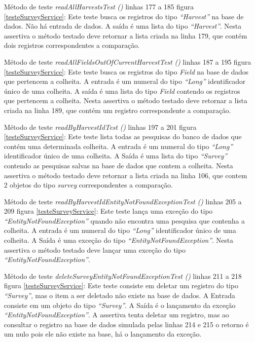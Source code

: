 Método de teste \textit{ readAllHarvestsTest ()} linhas 177 a 185 figura \ref{testeSurveyService}:  Este teste busca os registros do tipo \textit{“Harvest”} na base de dados. Não há entrada de dados.  A saída é uma lista do tipo \textit{“Harvest”}. Nesta assertiva o método testado deve retornar a lista criada na linha 179, que contém dois registros correspondentes a comparação.

Método de teste \textit{ readAllFieldsOutOfCurrentHarvestTest ()} linhas 187 a 195 figura \ref{testeSurveyService}: Este teste busca os registros do tipo \textit{Field} na base de dados que pertencem a colheita. A entrada é um numeral do tipo \textit{“Long”} identificador único de uma colheita.  A saída é uma lista do tipo \textit{Field} contendo os registros que pertencem a colheita. Nesta assertiva o método testado deve retornar a lista criada na linha 189, que contém um registro correspondente a comparação.

Método de teste \textit{ readByHarvestIdTest ()} linhas 197 a 201 figura \ref{testeSurveyService}: Este teste lista todas as pesquisas do banco de dados que contém uma determinada colheita. A entrada é um numeral do tipo \textit{“Long”} identificador único de uma colheita. A Saída é uma lista do tipo \textit{“Survey”} contendo as pesquisas salvas na base de dados que contem a colheita. Nesta assertiva o método testado deve retornar a lista criada na linha 106, que contem 2 objetos do tipo \textit{survey} correspondentes a comparação.

Método de teste \textit{ readByHarvestIdEntityNotFoundExceptionTest ()} linhas 205 a 209 figura \ref{testeSurveyService}: Este teste lança uma exceção do tipo \textit{“EntityNotFoundException”} quando não encontra uma pesquisa que contenha a colheita. A entrada é um numeral do tipo \textit{“Long”} identificador único de uma colheita. A Saída é uma exceção do tipo \textit{“EntityNotFoundException”}. Nesta assertiva o método testado deve lançar uma exceção do tipo \textit{“EntityNotFoundException”}.

Método de teste \textit{ deleteSurveyEntityNotFoundExceptionTest ()} linhas 211 a 218 figura \ref{testeSurveyService}: Este teste consiste em deletar um registro do tipo \textit{“Survey”}, mas o item a ser deletado não existe na base de dados. A Entrada consiste em um objeto do tipo \textit{“Survey”}. A Saída é o lançamento da exceção \textit{“EntityNotFoundException”}. A assertiva tenta deletar um registro, mas ao consultar o registro na base de dados simulada pelas linhas 214 e 215 o retorno é um nulo pois ele não existe na base, há o lançamento da exceção.  

